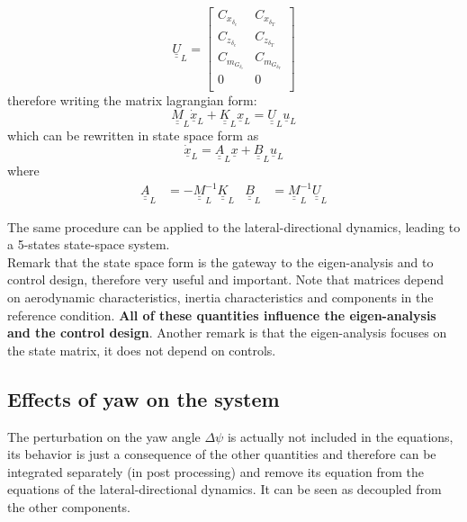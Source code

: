 \begin{equation}
    \underline{\underline{U}}_L = \begin{bmatrix}
        C_{x_{\delta_e}}    &C_{x_{\delta_T}}  \\
      C_{z_{\delta_e}}        & C_{z_{\delta_T}}  \\
       C_{m_{G_{\delta_e}}}   & C_{m_{G_{\delta_T}}}  \\
        0   & 0 \\
    \end{bmatrix}
\end{equation}
therefore writing the matrix lagrangian form:
\begin{equation}
    \underline{\underline{M}}_L \underline{\dot x}_L + \underline{\underline{K}}_L \underline{x}_L = \underline{\underline{U}}_L \underline{u}_L
\end{equation}
which can be rewritten in state space form as
\begin{equation}
    \underline{\dot x}_L = \underline{\underline{A}}_L \underline{x} + \underline{\underline{B}}_L \underline{u}_L
\end{equation}
where
\begin{align}
    \underline{\underline{A}}_L &= -\underline{\underline{M}}_L^{-1}\underline{\underline{K}}_L & \underline{\underline{B}}_L &= \underline{\underline{M}}_L^{-1}\underline{\underline{U}}_L 
\end{align}

The same procedure can be applied to the lateral-directional dynamics, leading to a 5-states state-space system.
\\
Remark that the state space form is the gateway to the eigen-analysis and to control design, therefore very useful and important.
Note that matrices depend on aerodynamic characteristics, inertia characteristics and components in the reference condition. \textbf{All of these quantities influence the eigen-analysis and the control design}. Another remark is that the eigen-analysis focuses on the state matrix, it does not depend on controls.
\subsection{Effects of yaw on the system}
The perturbation on the yaw angle $\Delta \psi$ is actually not included in the equations, its behavior is just a consequence of the other quantities and therefore can be integrated separately (in post processing) and remove its equation from the equations of the lateral-directional dynamics. It can be seen as decoupled from the other components.

